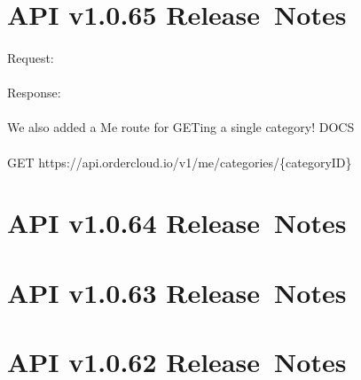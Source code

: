 \documentclass{memoir}%
\begin{document}
%
\section*{API v1.0.65 Release~Notes}%
\paragraph*{}%

%
\paragraph*{}%
Request:

%
\paragraph*{}%
Response:

%
\paragraph*{}%
We also added a Me route for GETing a single category! DOCS

%
\paragraph*{}%
GET https://api.ordercloud.io/v1/me/categories/\{categoryID\}

%
\section*{API v1.0.64 Release~Notes}%
\paragraph*{}%

%
\section*{API v1.0.63 Release~Notes}%
\paragraph*{}%

%
\section*{API v1.0.62 Release~Notes}%
\paragraph*{}%
\end{document}

